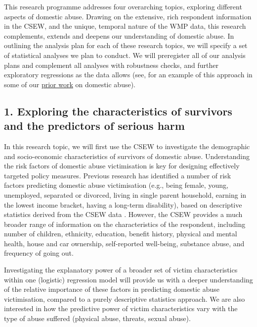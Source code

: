 \documentclass[11pt, a4paper]{article}
\newcommand{\NS}[1] {{\textcolor{green}{#1}}}
\begin{document}
This research programme addresses four overarching topics, exploring different aspects of domestic abuse. Drawing on the extensive, rich respondent information in the CSEW, and the unique, temporal nature of the WMP data, this research complements, extends and deepens our understanding of domestic abuse. In outlining the analysis plan for each of these research topics, we will specify a set of statistical analyses we plan to conduct. We will preregister all of our analysis plans and complement all analyses with robustness checks, and further exploratory regressions as the data allows (see, for an example of this approach in some of our \href{https://cog.warwick.ac.uk/~pssmar/Trendl_Stewart_Mullett.pdf}{prior work} on domestic abuse).

\subsection*{1. Exploring the characteristics of survivors and the predictors of serious harm}


In this research topic, we will first use the CSEW to investigate the demographic and socio-economic characteristics of survivors of domestic abuse. Understanding the risk factors of domestic abuse victimisation is key for designing effectively targeted policy measures. Previous research has identified a number of risk factors predicting domestic abuse victimisation (e.g., being female, young, unemployed, separated or divorced, living in single parent household, earning in the lowest income bracket, having a long-term disability), based on descriptive statistics derived from the CSEW data \cite{ONS}. However, the CSEW provides a much broader range of information on the characteristics of the respondent, including number of children, ethnicity, education, benefit history, physical and mental health, house and car ownership, self-reported well-being, substance abuse, and frequency of going out. 

Investigating the explanatory power of a broader set of victim characteristics within one (logistic) regression model will provide us with a deeper understanding of the relative importance of these factors in predicting domestic abuse victimisation, compared to a purely descriptive statistics approach. We are also interested in how the predictive power of victim characteristics vary with the type of abuse suffered (physical abuse, threats, sexual abuse).
\end{document}
